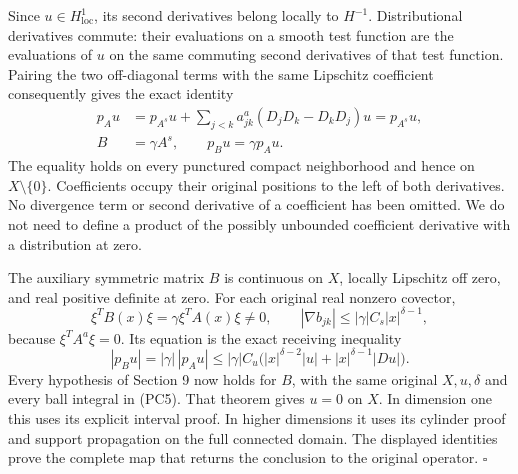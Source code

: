 \documentclass[
  11pt,
]{article}
\begin{document}
Since \(u\in H^1_{\mathrm{loc}}\), its second derivatives belong locally
to \(H^{-1}\). Distributional derivatives commute: their evaluations on
a smooth test function are the evaluations of \(u\) on the same
commuting second derivatives of that test function. Pairing the two
off-diagonal terms with the same Lipschitz coefficient consequently
gives the exact identity \[
 \begin{split}
 p_Au&=p_{A^s}u+\sum_{j<k}a^a_{jk}
                       (D_jD_k-D_kD_j)u=p_{A^s}u,\\
 B&=\gamma A^s,\qquad p_Bu=\gamma p_Au.
 \end{split}                                                    \tag{PCG3}
\] The equality holds on every punctured compact neighborhood and hence
on \(X\setminus\{0\}\). Coefficients occupy their original positions to
the left of both derivatives. No divergence term or second derivative of
a coefficient has been omitted. We do not need to define a product of
the possibly unbounded coefficient derivative with a distribution at
zero.

The auxiliary symmetric matrix \(B\) is continuous on \(X\), locally
Lipschitz off zero, and real positive definite at zero. For each
original real nonzero covector, \[
 \xi^TB(x)\xi=\gamma\xi^TA(x)\xi\ne0,\qquad
 |\nabla b_{jk}|\leq|\gamma|C_s|x|^{\delta-1},
\] because \(\xi^TA^a\xi=0\). Its equation is the exact receiving
inequality \[
 |p_Bu|=|\gamma|\,|p_Au|
 \leq|\gamma|C_u\bigl(|x|^{\delta-2}|u|
                     +|x|^{\delta-1}|Du|\bigr).
 \tag{PCG4}
\] Every hypothesis of Section 9 now holds for \(B\), with the same
original \(X,u,\delta\) and every ball integral in (PC5). That theorem
gives \(u=0\) on \(X\). In dimension one this uses its explicit interval
proof. In higher dimensions it uses its cylinder proof and support
propagation on the full connected domain. The displayed identities prove
the complete map that returns the conclusion to the original operator.
\(\square\)
\end{document}
